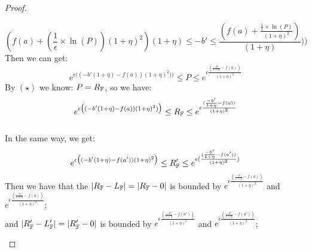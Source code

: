 \documentclass[a4paper,11pt]{article}
\begin{document}
\begin{proof}
\begin{itemize}
		\[
		(f(a) + 
				(\frac{1}{\epsilon} \times \ln(P))
				(1 + \eta)^2)
				{(1 + \eta)}
		\leq
		-b'
		\leq
		\frac{(
				f(a) + \frac{\frac{1}{\epsilon} 
				\times \ln(P)}
				{(1 + \eta)^2}
				)}
				{(1 + \eta)}
				 \big)
				\bigg)
		\]
		Then we can get:
		\[
		e^{\epsilon 
		\big( (-b'(1 + \eta) - f(a)) (1 + \eta)^2) \big)}
		\leq
		P
		\leq
		e^{\epsilon 
		\frac{(\frac{-b'}{1 + \eta} - f(a))}{(1 + \eta)^2}}
		\]
		By $(\star)$ we know: $P = R_{\mathbb{F}}$, so we have:
		\[
		e^{\epsilon 
		\big( (-b'(1 + \eta) - f(a)) (1 + \eta)^2) \big)}
		\leq
		R_{\mathbb{F}}
		\leq
		e^{\epsilon 
		\frac{(\frac{-b'}{1 + \eta} - f(a))}{(1 + \eta)^2}}
		\]
		\\		
		In the same way, we get:
		\[
		e^{\epsilon 
		\big((-b'(1 + \eta) - f(a'))(1 + \eta)^2 \big)}
		\leq
		R_{\mathbb{F}}'
		\leq
		e^{\epsilon 
		(\frac{(\frac{-b'}{1 + \eta} - f(a'))}{(1 + \eta)^2})}
		\]
		Then we have that the $|R_{\mathbb{F}} - L_{\mathbb{F}}| = |R_{\mathbb{F}} - 0|$ is bounded by 
		$e^{\epsilon 
		\frac{(\frac{-b'}{1 + \eta} - f(a))}{(1 + \eta)^2}}$ 
		and $e^{\epsilon 
		\frac{(\frac{-b'}{1 + \eta} - f(a))}{(1 + \eta)^2}}$;
		\\
		and $|R_{\mathbb{F}}' - L_{\mathbb{F}}'| = |R_{\mathbb{F}}' - 0|$ is bounded by 
		$e^{\epsilon 
		\frac{(\frac{-b'}{1 + \eta} - f(a'))}{(1 + \eta)^2}}$ 
		and $e^{\epsilon 
		\frac{(\frac{-b'}{1 + \eta} - f(a'))}{(1 + \eta)^2}}$;
		


\end{itemize}
\end{proof}
\end{document}
